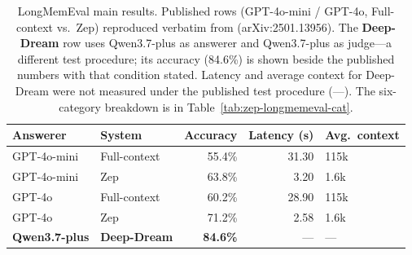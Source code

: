 \begin{table}[t]
\centering
\caption{LongMemEval main results. Published rows (GPT-4o-mini / GPT-4o, Full-context vs.\ Zep) reproduced verbatim from \citet{rasmussen2025zep} (arXiv:2501.13956). The \textbf{Deep-Dream} row uses Qwen3.7-plus as answerer and Qwen3.7-plus as judge---a different test procedure; its accuracy (84.6\%) is shown beside the published numbers with that condition stated. Latency and average context for Deep-Dream were not measured under the published test procedure (---). The six-category breakdown is in Table~\ref{tab:zep-longmemeval-cat}.}
\label{tab:zep-longmemeval}
\footnotesize
\begin{tabular}{llrrl}
\toprule
Answerer & System & Accuracy & Latency (s) & Avg.\ context \\
\midrule
GPT-4o-mini & Full-context & 55.4\% & 31.30 & 115k \\
GPT-4o-mini & Zep & 63.8\% & 3.20 & 1.6k \\
GPT-4o & Full-context & 60.2\% & 28.90 & 115k \\
GPT-4o & Zep & 71.2\% & 2.58 & 1.6k \\
\textbf{Qwen3.7-plus} & \textbf{Deep-Dream} & \textbf{84.6\%} & --- & --- \\
\bottomrule
\end{tabular}
\end{table}
